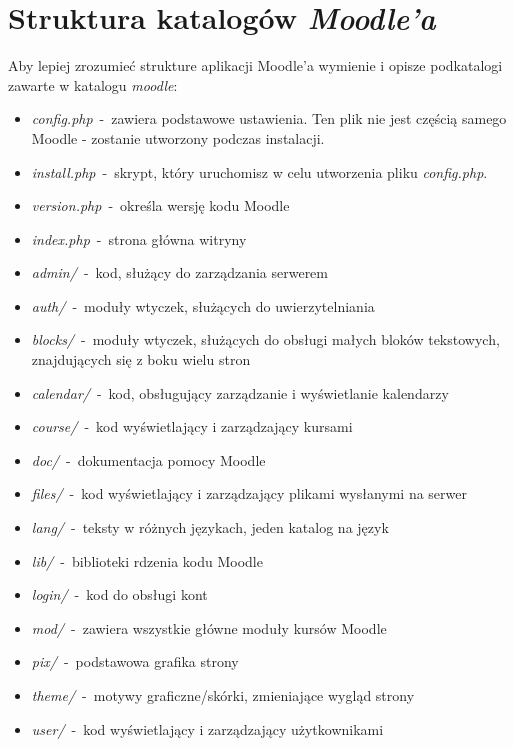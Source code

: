 \section{Struktura katalogów \textit{Moodle'a}} \label{roz:struktura_moodle}
Aby lepiej zrozumieć strukture aplikacji Moodle'a wymienie i opisze podkatalogi zawarte w katalogu \textit{moodle}: \cite{dokumentacja_moodle}\\
	\begin{itemize}
		\item \textit{config.php}~-~zawiera podstawowe ustawienia. Ten plik nie jest częścią samego Moodle - zostanie utworzony podczas instalacji.
		\item \textit{install.php}~-~skrypt, który uruchomisz w celu utworzenia pliku \textit{config.php}. 
		\item \textit{version.php}~-~określa wersję kodu Moodle 
		\item \textit{index.php}~-~strona główna witryny
		\item \textit{admin/}~-~kod, służący do zarządzania serwerem
		\item \textit{auth/}~-~moduły wtyczek, służących do uwierzytelniania 
		\item \textit{blocks/}~-~moduły wtyczek, służących do obsługi małych bloków tekstowych, znajdujących się z boku wielu stron 
		\item \textit{calendar/}~-~kod, obsługujący zarządzanie i wyświetlanie kalendarzy 
		\item \textit{course/}~-~kod wyświetlający i zarządzający kursami 
		\item \textit{doc/}~-~dokumentacja pomocy Moodle
		\item \textit{files/}~-~kod wyświetlający i zarządzający plikami wysłanymi na serwer 
		\item \textit{lang/}~-~teksty w różnych językach, jeden katalog na język 
		\item \textit{lib/}~-~biblioteki rdzenia kodu Moodle 
		\item \textit{login/}~-~kod do obsługi kont 
		\item \textit{mod/}~-~zawiera wszystkie główne moduły kursów Moodle 
		\item \textit{pix/}~-~podstawowa grafika strony 
		\item \textit{theme/}~-~motywy graficzne/skórki, zmieniające wygląd strony 
		\item \textit{user/}~-~kod wyświetlający i zarządzający użytkownikami 
	\end{itemize}
